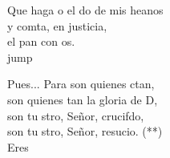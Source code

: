 \begin{cancion}
	Que haga o el do de mis heanos \\
	y comta, en justicia, \\
	el pan con os.\\jump\\
	\begin{chorus}%
	Pues... Para  son quienes ctan,\\
	son quienes tan la gloria de D,\\
	son tu stro, Señor, crucifdo,\\
	son tu stro, Señor, resucio. (**)\\
	Eres  \\
	\end{chorus}%
	\jump\\
\end{cancion}%
